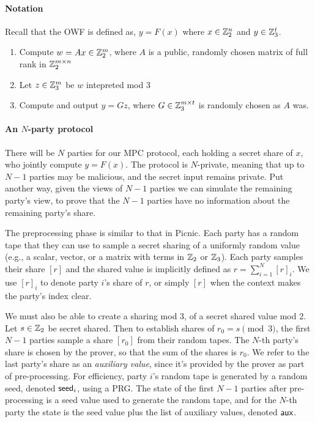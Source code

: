 \paragraph{Notation}
Recall that the OWF is defined as, $y = F(x)$ where $x \in \mathbb{Z}_2^{n}$ and $y\in \mathbb{Z}_3^{t}$. 
\begin{enumerate}
\item Compute $w = Ax \in \mathbb{Z}_2^{m}$, where $A$ is a public, randomly chosen matrix of full rank in $\mathbb{Z}_2^{m\times n}$
\item Let $z\in\mathbb{Z}_3^{m}$ be $w$ intepreted mod 3
\item Compute and output $y = Gz$, where $G \in \mathbb{Z}_3^{m\times t}$ is randomly chosen as $A$ was. 
\end{enumerate}


\paragraph{An $N$-party protocol}
There will be $N$ parties for our MPC protocol, each holding a secret share of
$x$, who jointly compute $y = F(x)$.  The protocol is $N$-private, meaning that
up to $N-1$ parties may be malicious, and the secret input remains private.
Put another way, given the views of $N-1$ parties we can simulate the remaining
party's view, to prove that the $N-1$ parties have no information about the
remaining party's share. 

The preprocessing phase is similar to that in Picnic.  Each party has a random
tape that they can use to sample a secret sharing of a uniformly random value
(e.g.,  a scalar, vector, or a matrix with terms in $\mathbb{Z}_2$ or $\mathbb{Z}_3$).  Each
party samples their share $[r]$ and the shared value is implicitly defined as
$r = \sum_{i=1}^N [r]_i$.  We use $[r]_i$ to denote party $i$'s share of $r$,
or simply $[r]$ when the context makes the party's index clear.

We must also be able to create a sharing mod 3, of a secret shared value mod 2.
Let $s\in\mathbb{Z}_2$ be secret shared.  Then to establish shares of $r_0 = s \pmod
3$, the first $N-1$ parties sample a share $[r_0]$ from their random tapes. The
$N$-th party's share is chosen by the prover, so that the sum of the shares is
$r_0$.  We refer to the last party's share as an \emph{auxiliary value}, since
it's provided by the prover as part of pre-processing.  For efficiency, party $i$'s
random tape is generated by a random seed, denoted $\textsf{seed}_i$, using a PRG. The state of the first
$N-1$ parties after pre-processing is a seed value used to generate the random
tape, and for the $N$-th party the state is the seed value plus the list of
auxiliary values, denoted $\textsf{aux}$. 

